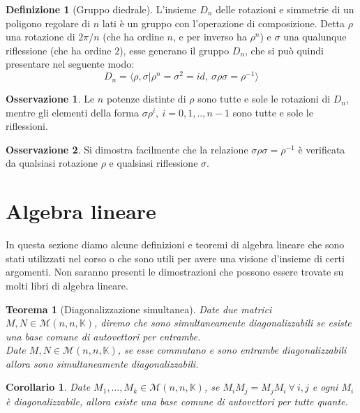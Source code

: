 \documentclass[11pt]{article}
\theoremstyle{plain}
\newtheorem{thm}{Teorema}[section]
\newtheorem*{cor}{Corollario}
\theoremstyle{definition}
\newtheorem{defn}{Definizione}[section]
\newtheorem*{rem}{Osservazione}
\theoremstyle{remark}
\newcommand{\K}{\mathbb{K}}
\begin{document}
\begin{defn}[Gruppo diedrale]
L'insieme $D_n$ delle rotazioni e simmetrie di un poligono regolare di $n$ lati è un gruppo con l'operazione di composizione.
Detta $\rho$ una rotazione di $2\pi/n$ (che ha ordine $n$, e per inverso ha $\rho^{n}$) e $\sigma$ una qualunque riflessione (che ha ordine $2$), esse generano
il gruppo $D_n$, che si può quindi presentare nel seguente modo: $$D_n=\langle\rho,\sigma|\rho^n=\sigma^2=id,\ \sigma\rho\sigma=\rho^{-1}\rangle$$
\end{defn}

\begin{rem}
 Le $n$ potenze distinte di $\rho$ sono tutte e sole le rotazioni di $D_n$, mentre gli elementi della forma $\sigma\rho^{i},\ i=0,1,..,n-1$ 
 sono tutte e sole le riflessioni. 
\end{rem}

\begin{rem}
 Si dimostra facilmente che la relazione $\sigma\rho\sigma=\rho^{-1}$ è verificata da qualsiasi rotazione $\rho$
 e qualsiasi riflessione $\sigma$.
\end{rem}







\newpage
\section{Algebra lineare}
In questa sezione diamo alcune definizioni e teoremi di algebra lineare che sono stati utilizzati nel corso o che sono utili per avere una visione d'insieme di certi argomenti. Non saranno presenti le dimostrazioni che possono essere trovate su molti libri di algebra lineare.
\begin{thm}[Diagonalizzazione simultanea]
\label{thm:diag_sim}
	Date due matrici $M, N\in \mathcal{M}(n,n,\K)$, diremo che sono \textit{simultaneamente diagonalizzabili} se esiste una base comune di autovettori per entrambe.\\
	Date $M, N\in \mathcal{M}(n,n,\K)$, se esse commutano e sono entrambe diagonalizzabili allora sono simultaneamente diagonalizzabili.
\end{thm}
\begin{cor}
	Date $M_1,\ldots,M_k \in \mathcal{M}(n,n,\K)$, se $M_iM_j=M_jM_i\ \forall\ i, j$ e ogni $M_i$ è diagonalizzabile, allora esiste una base comune di autovettori per tutte quante.
\end{cor}
\end{document}
